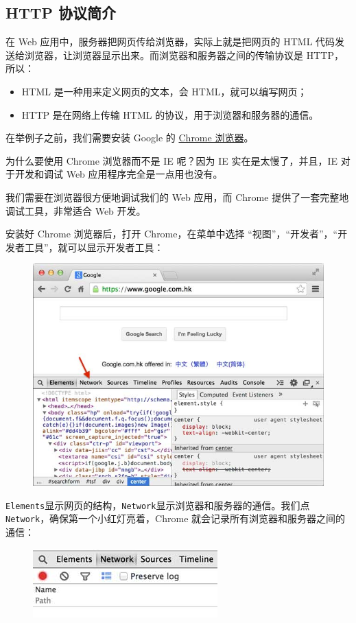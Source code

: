\hypertarget{http-ux534fux8baeux7b80ux4ecb}{%
\subsection{HTTP 协议简介}\label{http-ux534fux8baeux7b80ux4ecb}}

在 Web 应用中，服务器把网页传给浏览器，实际上就是把网页的 HTML
代码发送给浏览器，让浏览器显示出来。而浏览器和服务器之间的传输协议是
HTTP，所以：

\begin{itemize}
\item
  HTML 是一种用来定义网页的文本，会 HTML，就可以编写网页；
\item
  HTTP 是在网络上传输 HTML 的协议，用于浏览器和服务器的通信。
\end{itemize}

在举例子之前，我们需要安装 Google 的
\href{http://www.google.com/intl/zh-CN/chrome/}{Chrome 浏览器}。

为什么要使用 Chrome 浏览器而不是 IE 呢？因为 IE 实在是太慢了，并且，IE
对于开发和调试 Web 应用程序完全是一点用也没有。

我们需要在浏览器很方便地调试我们的 Web 应用，而 Chrome
提供了一套完整地调试工具，非常适合 Web 开发。

安装好 Chrome 浏览器后，打开 Chrome，在菜单中选择
``视图''，``开发者''，``开发者工具''，就可以显示开发者工具：

 
 \begin{figure}[htp]
	\centering
	\includegraphics[width=0.6\linewidth]{fig/950415476737952.png}
\end{figure}


\texttt{Elements}显示网页的结构，\texttt{Network}显示浏览器和服务器的通信。我们点\texttt{Network}，确保第一个小红灯亮着，Chrome
就会记录所有浏览器和服务器之间的通信：

 
 \begin{figure}[htp]
	\centering
	\includegraphics[width=0.6\linewidth]{fig/950415873256992.png}
\end{figure}


